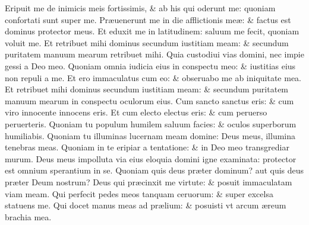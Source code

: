 \documentclass[a5paper,10pt]{book}
\def\ae{æ}
\begin{document}
\begin{multicols*}{2}
\newline \color{red} E\color{black}ripuit me de inimicis meis fortissimis, \& ab his qui oderunt me: quoniam confortati sunt super me.
\newline \color{red} P\color{black}r\ae uenerunt me in die afflictionis me\ae : \& factus est dominus protector meus.
\newline \color{red} E\color{black}t eduxit me in latitudinem: saluum me fecit, quoniam voluit me.
\newline \color{red} E\color{black}t retribuet mihi dominus secundum iustitiam meam: \& secundum puritatem manuum mearum retribuet mihi.
\newline \color{red} Q\color{black}uia custodiui vias domini, nec impie gessi a Deo meo.
\newline \color{red} Q\color{black}uoniam omnia iudicia eius in conspectu meo: \& iustitias eius non repuli a me.
\newline \color{red} E\color{black}t ero immaculatus cum eo: \& obseruabo me ab iniquitate mea.
\newline \color{red} E\color{black}t retribuet mihi dominus secundum iustitiam meam: \& secundum puritatem manuum mearum in conspectu oculorum eius.
\newline \color{red} C\color{black}um sancto sanctus eris: \& cum viro innocente innocens eris.
\newline \color{red} E\color{black}t cum electo electus eris: \& cum peruerso peruerteris.
\newline \color{red} Q\color{black}uoniam tu populum humilem saluum facies: \& oculos superborum humiliabis.
\newline \color{red} Q\color{black}uoniam tu illuminas lucernam meam domine: Deus meus, illumina tenebras meas.
\newline \color{red} Q\color{black}uoniam in te eripiar a tentatione: \& in Deo meo transgrediar murum.
\newline \color{red} D\color{black}eus meus impolluta via eius eloquia domini igne examinata: protector est omnium sperantium in se.
\newline \color{red} Q\color{black}uoniam quis deus pr\ae ter dominum? aut quis deus pr\ae ter Deum nostrum?
\newline \color{red} D\color{black}eus qui pr\ae cinxit me virtute: \& posuit immaculatam viam meam.
\newline \color{red} Q\color{black}ui perfecit pedes meos tanquam ceruorum: \& super excelsa statuens me.
\newline \color{red} Q\color{black}ui docet manus meas ad pr\ae lium: \& posuisti vt arcum \ae reum brachia mea.

\end{multicols*}
\end{document}
